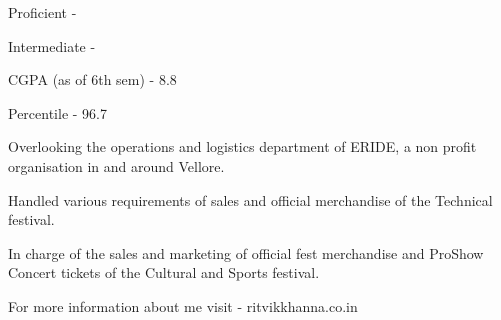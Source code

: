 








Proficient - 


Intermediate - 

\divider\smallskip



\medskip


CGPA (as of 6th sem) - 8.8

\divider\smallskip

Percentile - 96.7

\medskip

Overlooking the operations and logistics department of ERIDE, a non profit organisation in and around Vellore.

\divider\smallskip

Handled various requirements of sales and official merchandise of the Technical festival.


\divider\smallskip

In charge of the sales and marketing of official fest merchandise and ProShow Concert tickets of the Cultural and Sports festival.

\divider\smallskip

For more information about me visit - ritvikkhanna.co.in